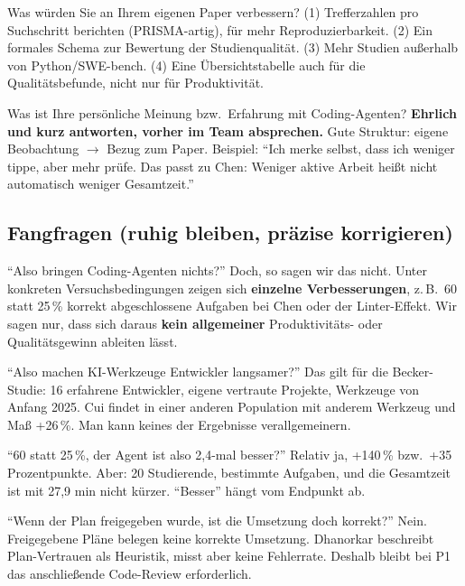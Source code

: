 \documentclass[12pt,a4paper]{article}
\begin{document}
\begin{qa}{Was würden Sie an Ihrem eigenen Paper verbessern?}
(1) Trefferzahlen pro Suchschritt berichten (PRISMA-artig), für mehr Reproduzierbarkeit. (2) Ein formales Schema zur Bewertung der Studienqualität. (3) Mehr Studien außerhalb von Python/SWE-bench. (4) Eine Übersichtstabelle auch für die Qualitätsbefunde, nicht nur für Produktivität.
\end{qa}

\begin{qa}{Was ist Ihre persönliche Meinung bzw.\ Erfahrung mit Coding-Agenten?}
\textbf{Ehrlich und kurz antworten, vorher im Team absprechen.} Gute Struktur: eigene Beobachtung $\to$ Bezug zum Paper. Beispiel: \enquote{Ich merke selbst, dass ich weniger tippe, aber mehr prüfe. Das passt zu Chen: Weniger aktive Arbeit heißt nicht automatisch weniger Gesamtzeit.}
\end{qa}

\subsection{Fangfragen (ruhig bleiben, präzise korrigieren)}

\begin{qa}{\enquote{Also bringen Coding-Agenten nichts?}}
Doch, so sagen wir das nicht. Unter konkreten Versuchsbedingungen zeigen sich \textbf{einzelne Verbesserungen}, z.\,B.\ 60 statt 25\,\% korrekt abgeschlossene Aufgaben bei Chen oder der Linter-Effekt. Wir sagen nur, dass sich daraus \textbf{kein allgemeiner} Produktivitäts- oder Qualitätsgewinn ableiten lässt.
\end{qa}

\begin{qa}{\enquote{Also machen KI-Werkzeuge Entwickler langsamer?}}
Das gilt für die Becker-Studie: 16 erfahrene Entwickler, eigene vertraute Projekte, Werkzeuge von Anfang 2025. Cui findet in einer anderen Population mit anderem Werkzeug und Maß +26\,\%. Man kann keines der Ergebnisse verallgemeinern.
\end{qa}

\begin{qa}{\enquote{60 statt 25\,\%, der Agent ist also 2,4-mal besser?}}
Relativ ja, +140\,\% bzw.\ +35 Prozentpunkte. Aber: 20 Studierende, bestimmte Aufgaben, und die Gesamtzeit ist mit 27,9 min nicht kürzer. \enquote{Besser} hängt vom Endpunkt ab.
\end{qa}

\begin{qa}{\enquote{Wenn der Plan freigegeben wurde, ist die Umsetzung doch korrekt?}}
Nein. Freigegebene Pläne belegen keine korrekte Umsetzung. Dhanorkar beschreibt Plan-Vertrauen als Heuristik, misst aber keine Fehlerrate. Deshalb bleibt bei P1 das anschließende Code-Review erforderlich.
\end{qa}
\end{document}
